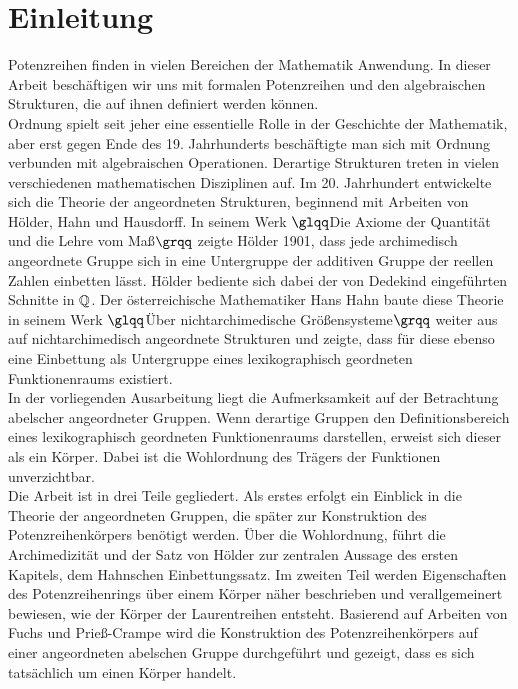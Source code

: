 \chapter{Einleitung}
%
Potenzreihen finden in vielen Bereichen der Mathematik Anwendung. In dieser Arbeit beschäftigen wir uns mit formalen Potenzreihen und den algebraischen Strukturen, die auf ihnen definiert werden können. \\
Ordnung spielt seit jeher eine essentielle Rolle in der Geschichte der Mathematik, aber erst gegen Ende des 19. Jahrhunderts beschäftigte man sich mit Ordnung verbunden mit algebraischen Operationen. Derartige Strukturen treten in vielen verschiedenen mathematischen Disziplinen auf. Im 20. Jahrhundert entwickelte sich die Theorie der angeordneten Strukturen, beginnend mit Arbeiten von Hölder, Hahn und Hausdorff. In seinem Werk $\glqq$Die Axiome der Quantität und die Lehre vom Maß$\grqq$ zeigte Hölder 1901, dass jede archimedisch angeordnete Gruppe sich in eine Untergruppe der additiven Gruppe der reellen Zahlen einbetten lässt. Hölder bediente sich dabei der von Dedekind eingeführten Schnitte in $\mathbb{Q}$. Der österreichische Mathematiker Hans Hahn baute diese Theorie in seinem Werk $\glqq$Über nichtarchimedische Größensysteme$\grqq$ weiter aus auf nichtarchimedisch angeordnete Strukturen und zeigte, dass für diese ebenso eine Einbettung als Untergruppe eines lexikographisch geordneten Funktionenraums existiert. \\
In der vorliegenden Ausarbeitung liegt die Aufmerksamkeit auf der Betrachtung abelscher angeordneter Gruppen. Wenn derartige Gruppen den Definitionsbereich eines lexikographisch geordneten Funktionenraums darstellen, erweist sich dieser als ein Körper. Dabei ist die Wohlordnung des Trägers der Funktionen unverzichtbar.  \\
Die Arbeit ist in drei Teile gegliedert. Als erstes erfolgt ein Einblick in die Theorie der angeordneten Gruppen, die später zur Konstruktion des Potenzreihenkörpers benötigt werden. Über die Wohlordnung, führt die Archimedizität und der Satz von Hölder zur zentralen Aussage des ersten Kapitels, dem Hahnschen Einbettungssatz. Im zweiten Teil werden Eigenschaften des Potenzreihenrings über einem Körper näher beschrieben und verallgemeinert bewiesen, wie der Körper der Laurentreihen entsteht. Basierend auf Arbeiten von Fuchs und Prieß-Crampe wird die Konstruktion des Potenzreihenkörpers auf einer angeordneten abelschen Gruppe durchgeführt und gezeigt, dass es sich tatsächlich um einen Körper handelt.




%
%
%
